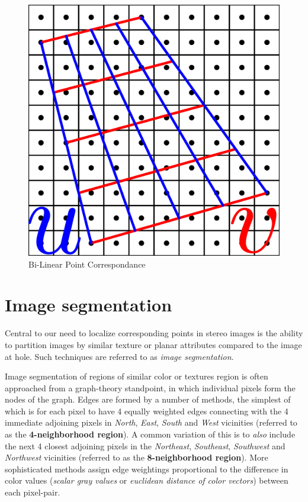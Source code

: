 \documentclass{report}
\begin{document}
\begin{figure}[htbp]
	\centering
%	
	\includegraphics[scale=0.25]{BiLinear_Point_Correspondance_v1}
	\caption{Bi-Linear Point Correspondance}
\end{figure}

\chapter{Image segmentation}
\par Central to our need to localize corresponding points in stereo images is the ability to partition images by similar texture or planar attributes compared to the image at hole. Such techniques are referred to as \textit{image segmentation}. 
\par Image segmentation of regions of similar color or textures region is often approached from a graph-theory standpoint, in which individual pixels form the nodes of the graph. Edges are formed by a number of methods, the simplest of which is for each pixel to have 4 equally weighted edges connecting with the 4 immediate adjoining pixels in \textit{North}, \textit{East}, \textit{South} and \textit{West} vicinities (referred to as the \textbf{4-neighborhood region}). A common variation of this is to \textit{also} include the next 4 closest adjoining pixels in the \textit{Northeast}, \textit{Southeast}, \textit{Southwest} and \textit{Northwest} vicinities (referred to as the \textbf{8-neighborhood region}). More sophisticated methods assign edge weightings proportional to the difference in color values (\textit{scalar gray values} or \textit{euclidean distance of color vectors}) between each pixel-pair.
\end{document}
